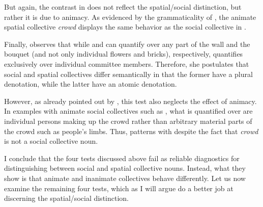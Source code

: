 \documentclass[output=paper]{langscibook}
\begin{document}
	\ea\label{wan:ex:partitive} 
		\label{wan:ex:partitive-committee}
		\label{wan:ex:partitive-bunch}
    \z	
    \z

\noindent But again, the contrast in  does not reflect the spatial/social distinction, but rather it is due to animacy. As evidenced by the grammaticality of , the animate spatial collective \textit{crowd} displays the same behavior as the social collective in .

\label{wan:ex:partitive-crowd}
\z

\noindent Finally, \citeauthor{pearson2011new} observes that while  and  can quantify over any part of the wall and the bouquet (and not only individual flowers and bricks), respectively,  quantifies exclusively over individual committee members. Therefore, she postulates that social and spatial collectives differ semantically in that the former have a plural denotation, while the latter have an atomic denotation. 
	
	\ea\label{wan:ex:denotation} 
		\label{wan:ex:denotation-committee}
		\label{wan:ex:denotation-bunch}
    \z	
    \z

\noindent However, as already pointed out by \citet{zwarts2020contiguity}, this test also neglects the effect of animacy. In examples with animate social collectives such as , what is quantified over are individual persons making up the crowd rather than arbitrary material parts of the crowd such as people's limbs. Thus,  patterns with  despite the fact that \textit{crowd} is not a social collective noun. 

	\label{wan:ex:denotation-crowd}
	\z

\noindent I conclude that the four tests discussed above fail as reliable diagnostics for distinguishing between social and spatial collective nouns. Instead, what they show is that animate and inanimate collectives behave differently. Let us now examine the remaining four tests, which as I will argue do a better job at discerning the spatial/social distinction.
\end{document}
